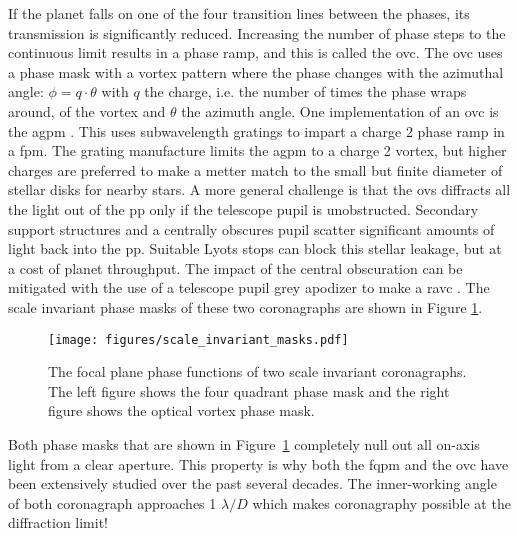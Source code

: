 \documentclass[letterpaper]{ar-1col}
\newcommand{\ld}{$\lambda/D$}
\begin{document}
If the planet falls on one of the four transition lines between the phases, its transmission is significantly reduced.
%
Increasing the number of phase steps to the continuous limit results in a phase ramp, and this is called the \ac{ovc}.
%
The \ac{ovc} uses a phase mask with a vortex pattern where the phase changes with the azimuthal angle: $\phi=q \cdot \theta$ with $q$ the charge, i.e. the number of times the phase wraps around, of the vortex and $\theta$ the azimuth angle.
%
One implementation of an \ac{ovc} is the \acl{agpm} \citep[\acs{agpm}; ][]{Mawet05b}.
%
This uses subwavelength gratings to impart a charge 2 phase ramp in a \ac{fpm}.
%
The grating manufacture limits the \ac{agpm} to a charge 2 vortex, but higher charges are preferred to make a metter match to the small but finite diameter of stellar disks for nearby stars.
%
A more general challenge is that the \ac{ovs} diffracts all the light out of the \ac{pp} only if the telescope pupil is unobstructed.
%
Secondary support structures and a centrally obscures pupil scatter significant amounts of light back into the \ac{pp}.
%
Suitable Lyots stops can block this stellar leakage, but at a cost of planet throughput.
%
The impact of the central obscuration can be mitigated with the use of a telescope pupil grey apodizer to make a \acl{ravc} \citep[\acs{ravc}; ][]{Mawet13a}.
%
The scale invariant phase masks of these two coronagraphs are shown in Figure \ref{fig:scale_invariant}.

\begin{figure}[ht]
  \centering
  \texttt{[image: figures/scale\_invariant\_masks.pdf]}
  \caption{The focal plane phase functions of two scale invariant coronagraphs.
  The left figure shows the four quadrant phase mask and the right figure shows the optical vortex phase mask.}
  \label{fig:scale_invariant}
\end{figure}

Both phase masks that are shown in Figure~\ref{fig:scale_invariant} completely null out all on-axis light from a clear aperture.
%
This property is why both the \ac{fqpm} and the \ac{ovc} have been extensively studied over the past several decades.
%
The inner-working angle of both coronagraph approaches 1 \ld{} which makes coronagraphy possible at the diffraction limit!
%

%
\end{document}

